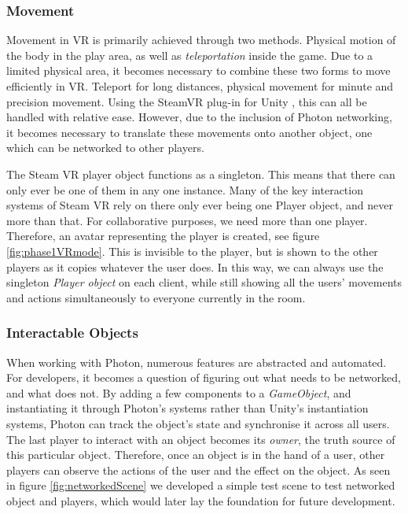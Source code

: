 \subsubsection{Movement}
Movement in VR is primarily achieved through two methods. Physical motion of the body in the play area, as well as \textit{teleportation} inside the game. Due to a limited physical area, it becomes necessary to combine these two forms to move efficiently in VR. Teleport for long distances, physical movement for minute and precision movement. Using the SteamVR plug-in for Unity \cite{steamVRAPI}, this can all be handled with relative ease. However, due to the inclusion of Photon networking, it becomes necessary to translate these movements onto another object, one which can be networked to other players. 

The Steam VR player object functions as a singleton. This means that there can only ever be one of them in any one instance. Many of the key interaction systems of Steam VR rely on there only ever being one Player object, and never more than that. For collaborative purposes, we need more than one player. Therefore, an avatar representing the player is created, see figure \ref{fig:phase1VRmode}. This is invisible to the player, but is shown to the other players as it copies whatever the user does. In this way, we can always use the singleton \textit{Player object} on each client, while still showing all the users' movements and actions simultaneously to everyone currently in the room. 

\subsubsection{Interactable Objects}
When working with Photon, numerous features are abstracted and automated. For developers, it becomes a question of figuring out what needs to be networked, and what does not. By adding a few components to a \textit{GameObject}, and instantiating it through Photon's systems rather than Unity's instantiation systems, Photon can track the object's state and synchronise it across all users. The last player to interact with an object becomes its \textit{owner}, the truth source of this particular object. Therefore, once an object is in the hand of a user, other players can observe the actions of the user and the effect on the object. As seen in figure \ref{fig:networkedScene} we developed a simple test scene to test networked object and players, which would later lay the foundation for future development.

